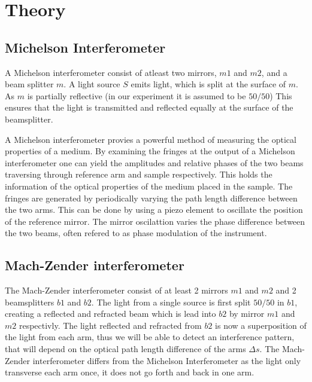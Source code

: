 \section{Theory}
\subsection{Michelson Interferometer}
A Michelson interferometer consist of atleast two mirrors, $m1$ and $m2$, and a beam splitter $m$. A light source $S$ emits light, which is split at the surface of $m$. As $m$ is partially reflective (in our experiment it is assumed to be $50/50$) This ensures that the light is transmitted and reflected equally at the surface of the beamsplitter.

A Michelson interferometer provies a powerful method of measuring the optical properties of a medium. By examining the fringes at the output of a Michelson interferometer one can yield the amplitudes and relative phases of the two beams traversing through reference arm and sample respectively. This holds the information of the optical properties of the medium placed in the sample. The fringes are generated by periodically varying the path length difference between the two arms. This can be done by using a piezo element to oscillate the position of the reference mirror. The mirror oscilattion varies the phase difference between the two beams, often refered to as phase modulation of the instrument.

\subsection{Mach-Zender interferometer}

The Mach-Zender interferometer consist of at least 2 mirrors $m1$ and $m2$ and 2 beamsplitters $b1$ and $b2$. The light from a single source is first split $50/50$ in $b1$, creating a reflected and refracted beam which is lead into $b2$ by mirror $m1$ and $m2$ respectivly. The light reflected and refracted from $b2$ is now a superposition of the light from each arm, thus we will be able to detect an interference pattern, that will depend on the optical path length difference of the arms $\Delta s$. The Mach-Zender interferometer differs from the Michelson Interferometer as the light only transverse each arm once, it does not go forth and back in one arm. 

